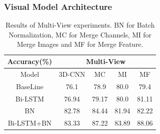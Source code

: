 \subsubsection{Visual Model Architecture}

\begin{table}[h]
\centering
    \begin{tabular}{c|cccc}
        \multicolumn{1}{c|}{Accuracy(\%)} &%
        \multicolumn{4}{c}{Multi-View}\\ \hline
        Model&%
        3D-CNN & MC & MI & MF \\\hline
        BaseLine%
        & %
        76.1 & 78.9& 80.0& 79.4\\
        Bi-LSTM%
        & %
        76.94 & 79.17& 80.0& 81.11\\
        BN%
        & %
         82.78& 84.44& 81.94& 82.22\\
        Bi-LSTM+BN%
        & %
         83.33& 87.22& 83.89& 88.06\\
    \end{tabular}
    \caption{Results of Multi-View experiments. BN for Batch Normalization, MC for Merge Channels, MI for Merge Images and MF for Merge Feature.}
    \label{tab:multitb}
\end{table}


